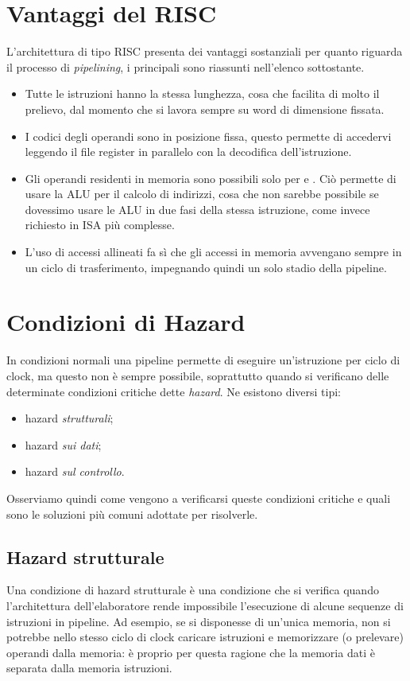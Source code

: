 \section{Vantaggi del RISC}
L'architettura di tipo RISC presenta dei vantaggi sostanziali per quanto riguarda il processo di \emph{pipelining}, i principali sono riassunti nell'elenco sottostante.
\begin{itemize}
	\item Tutte le istruzioni hanno la stessa lunghezza, cosa che facilita di molto il prelievo, dal momento che si lavora sempre su word di dimensione fissata.
	\item I codici degli operandi sono in posizione fissa, questo permette di accedervi leggendo il file register in parallelo con la decodifica dell’istruzione.
	\item Gli operandi residenti in memoria sono possibili solo per  e . Ciò permette di usare la ALU per il calcolo di indirizzi, cosa che non sarebbe possibile se dovessimo usare le ALU in due fasi della stessa istruzione, come invece richiesto in ISA più complesse.
	\item  L’uso di accessi allineati fa sì che gli accessi in memoria avvengano sempre in un ciclo di trasferimento, impegnando quindi un solo stadio della pipeline.
\end{itemize}

\section{Condizioni di Hazard}
In condizioni normali una pipeline permette di eseguire un'istruzione per ciclo di clock, ma questo non è sempre possibile, soprattutto quando si verificano delle determinate condizioni critiche dette \emph{hazard}. Ne esistono diversi tipi:
\begin{itemize}
	\item hazard \emph{strutturali};
	\item hazard \emph{sui dati};
	\item hazard \emph{sul controllo}.
\end{itemize}
Osserviamo quindi come vengono a verificarsi queste condizioni critiche e quali sono le soluzioni più comuni adottate per risolverle.

\subsection{Hazard strutturale}
Una condizione di hazard strutturale è una condizione che si verifica quando l'architettura dell’elaboratore rende impossibile l’esecuzione di alcune sequenze di istruzioni in pipeline. Ad esempio, se si disponesse di un'unica memoria, non si potrebbe nello stesso ciclo di clock caricare istruzioni e memorizzare (o prelevare) operandi dalla memoria: è proprio per questa ragione che la memoria dati è separata dalla memoria istruzioni.

